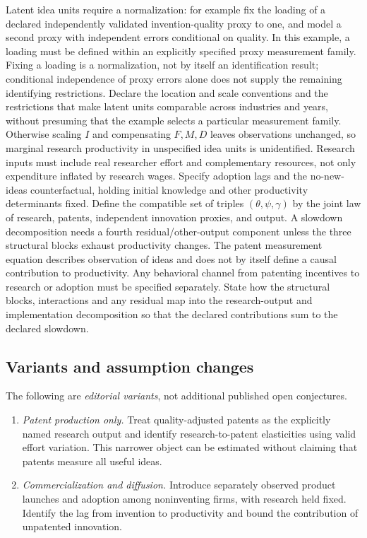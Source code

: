 \documentclass[11pt,a4paper]{article}
\begin{document}
Latent idea units require a normalization: for example fix the loading of a declared independently validated invention-quality proxy to one, and model a second proxy with independent errors conditional on quality. In this example, a loading must be defined within an explicitly specified proxy measurement family. Fixing a loading is a normalization, not by itself an identification result; conditional independence of proxy errors alone does not supply the remaining identifying restrictions. Declare the location and scale conventions and the restrictions that make latent units comparable across industries and years, without presuming that the example selects a particular measurement family. Otherwise scaling \(I\) and compensating \(F,M,D\) leaves observations unchanged, so marginal research productivity in unspecified idea units is unidentified. Research inputs must include real researcher effort and complementary resources, not only expenditure inflated by research wages. Specify adoption lags and the no-new-ideas counterfactual, holding initial knowledge and other productivity determinants fixed. Define the compatible set of triples \((\theta,\psi,\gamma)\) by the joint law of research, patents, independent innovation proxies, and output. A slowdown decomposition needs a fourth residual/other-output component unless the three structural blocks exhaust productivity changes. The patent measurement equation describes observation of ideas and does not by itself define a causal contribution to productivity. Any behavioral channel from patenting incentives to research or adoption must be specified separately. State how the structural blocks, interactions and any residual map into the research-output and implementation decomposition so that the declared contributions sum to the declared slowdown.
\subsection*{Variants and assumption changes}
The following are \emph{editorial variants}, not additional published open conjectures.
\begin{enumerate}
\item \emph{Patent production only.} Treat quality-adjusted patents as the explicitly named research output and identify research-to-patent elasticities using valid effort variation. This narrower object can be estimated without claiming that patents measure all useful ideas.
\item \emph{Commercialization and diffusion.} Introduce separately observed product launches and adoption among noninventing firms, with research held fixed. Identify the lag from invention to productivity and bound the contribution of unpatented innovation.
\end{enumerate}
\end{document}
